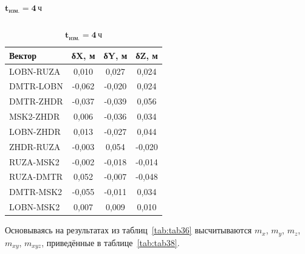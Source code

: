\begin{table} [htbp]
{\begin{subtable}{.47\linewidth}
\begin{tabular}{ l
			S[table-number-alignment = center]
			S[table-number-alignment = center]
			S[table-number-alignment = center] }
		
	\end{tabular}
\end{subtable}%
%
		\qquad
		\begin{subtable}{.47\linewidth}	
	\centering
	\caption*{$\mathbf{t_\text{изм.}=4\,\text{ч}}$}
	\begin{tabular}{ l
			S[table-number-alignment = center]
			S[table-number-alignment = center]
			S[table-number-alignment = center] }
		
		
		\hline
		\textbf{Вектор}				& \textbf{δX, м}	& \textbf{δY, м}	& \textbf{δZ, м}	\\ \hline
		LOBN-RUZA					&      0,010		& 	   0,027		&      0,024		\\ %
		DMTR-LOBN					&     -0,062		&     -0,020		&      0,024		\\ %
		DMTR-ZHDR					&     -0,037		&     -0,039		&      0,056		\\ %
		MSK2-ZHDR					&      0,006		&     -0,036		&      0,034		\\ %
		LOBN-ZHDR					&      0,013		&     -0,027		&      0,044		\\ %
		ZHDR-RUZA					&     -0,003		&      0,054		&     -0,020		\\ %
		RUZA-MSK2					&     -0,002		&     -0,018		&     -0,014		\\ %
		RUZA-DMTR					&      0,052		&     -0,007		&     -0,048		\\ %
		DMTR-MSK2					&     -0,055		&     -0,011		&      0,034		\\ %
		LOBN-MSK2					&      0,007		&      0,009		&      0,010		\\ \hline
		
		
	\end{tabular}
\end{subtable}%
\hfill%
	}
\end{table}	

Основываясь на результатах из таблиц~\cref{tab:tab36}  высчитываются $m_x$, $m_y$, $m_z$, $m_{xy}$, $m_{xyz}$, приведённые в таблице~\cref{tab:tab38}.



